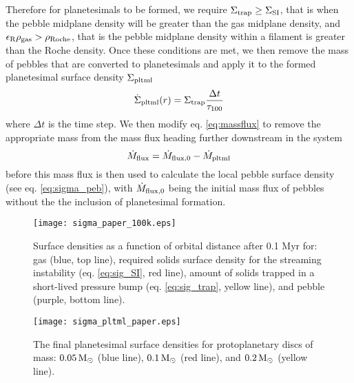 \documentclass[a4paper,fleqn,usenatbib]{mnras}
\newcommand{\msun}{{\, {\rm M}_{\odot}}}
\begin{document}
Therefore for planetesimals to be formed, we require $\Sigma_{\rm trap} \ge \Sigma_{\rm SI}$, that is when the pebble midplane density will be greater than the gas midplane density, and $\epsilon_{\rm R}\rho_{\rm gas} > \rho_{\rm Roche}$, that is the pebble midplane density within a filament is greater than the Roche density.
Once these conditions are met, we then remove the mass of pebbles that are converted to planetesimals and apply it to the formed planetesimal surface density $\Sigma_{\rm pltml}$
\begin{equation}
\label{eq:sig_pltml}
    \dot{\Sigma}_{\rm pltml}(r) = \Sigma_{\rm trap}\dfrac{\Delta t}{\tau_{100}}
\end{equation}
where $\Delta t$ is the time step.
We then modify eq. \ref{eq:massflux} to remove the appropriate mass from the mass flux heading further downstream in the system
\begin{equation}
    \dot{M}_{\rm flux} = \dot{M}_{\rm flux,0} - \dot{M}_{\rm pltml}
\end{equation}
before this mass flux is then used to calculate the local pebble surface density (see eq. \ref{eq:sigma_peb}), with $\dot{M}_{\rm flux,0}$ being the initial mass flux of pebbles without the the inclusion of planetesimal formation.

\begin{figure}
\centering
\texttt{[image: sigma\_paper\_100k.eps]}
\caption{Surface densities as a function of orbital distance after 0.1 Myr for: gas (blue, top line), required solids surface density for the streaming instability (eq. \ref{eq:sig_SI}, red line), amount of solids trapped in a short-lived pressure bump (eq. \ref{eq:sig_trap}, yellow line), and pebble (purple, bottom line).}
\label{fig:sigmas}
\end{figure}

\begin{figure}
\centering
\texttt{[image: sigma\_pltml\_paper.eps]}
\caption{The final planetesimal surface densities for protoplanetary discs of mass: $0.05 \msun$ (blue line), $0.1 \msun$ (red line), and $0.2 \msun$ (yellow line).}
\label{fig:sigma_pltml}
\end{figure}
\end{document}
